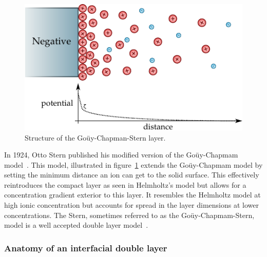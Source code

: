       \begin{figure}
        \begin{center}
          \includegraphics{content/introduction/graphics/model_stern}
        \end{center}
        \caption{Structure of the Goüy-Chapman-Stern layer.}
        \label{fig:doubleLayerModel_stern}
      \end{figure}
      In 1924, Otto Stern published his modified version of the Goüy-Chapmam model~\cite{Stern1924}.
      This model, illustrated in figure~\ref{fig:doubleLayerModel_stern} extends the Goüy-Chapmam model by setting the minimum distance an ion can get to the solid surface.
      This effectively reintroduces the compact layer as seen in Helmholtz's model but allows for a concentration gradient exterior to this layer.
      It resembles the Helmholtz model at high ionic concentration but accounts for spread in the layer dimensions at lower concentrations.
      The Stern, sometimes referred to as the Goüy-Chapmam-Stern, model is a well accepted double layer model~\cite{Olthuis2005}.


    \subsubsection*{Anatomy of an interfacial double layer}


